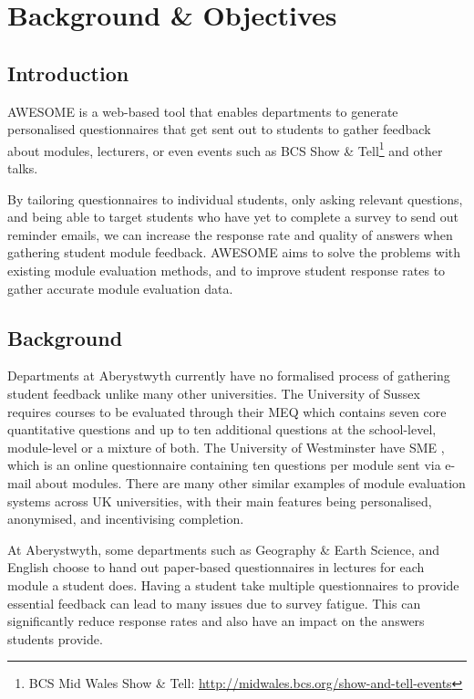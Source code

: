 \chapter{Background \& Objectives}

	\section{Introduction}
	\label{sec:background}
	
	\acf{AWESOME} is a web-based tool that enables departments to generate personalised questionnaires that get sent out to students to gather feedback about modules, lecturers, or even events such as BCS Show \& Tell\footnote{BCS Mid Wales Show \& Tell: \url{http://midwales.bcs.org/show-and-tell-events}} and other talks.
	
	By tailoring questionnaires to individual students, only asking relevant questions, and being able to target students who have yet to complete a survey to send out reminder emails, we can increase the response rate and quality of answers when gathering student module feedback.
	\ac{AWESOME} aims to solve the problems with existing module evaluation methods, and to improve student response rates to gather accurate module evaluation data.
	
	\section{Background}

	Departments at Aberystwyth currently have no formalised process of gathering student feedback unlike many other universities.
	The University of Sussex requires courses to be evaluated through their \ac{MEQ} \cite{meq} which contains seven core quantitative questions and up to ten additional questions at the school-level, module-level or a mixture of both.
	The University of Westminster have \ac{SME} \cite{sme}, which is an online questionnaire containing ten questions per module sent via e-mail about modules.
	There are many other similar examples of module evaluation systems across UK universities, with their main features being personalised, anonymised, and incentivising completion.
	
	At Aberystwyth, some departments such as Geography \& Earth Science, and English choose to hand out paper-based questionnaires in lectures for each module a student does.
	Having a student take multiple questionnaires to provide essential feedback can lead to many issues due to survey fatigue.
	This can significantly reduce response rates and also have an impact on the answers students provide.
	
